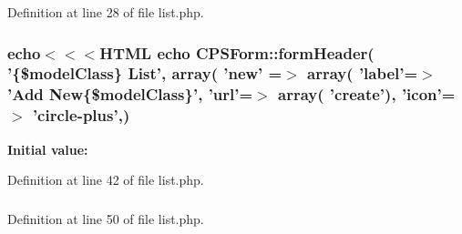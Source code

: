 Definition at line 28 of file list.php.

\hypertarget{list_8php_aa3205d038c7f8feb5c9f01ac4dfadc88}{
\subsubsection[{array}]{\setlength{\rightskip}{0pt plus 5cm}echo$<$$<$$<${\bf HTML} echo CPSForm::formHeader( '\{\$modelClass\} List', {\bf array}( 'new' =$>$ {\bf array}( 'label'=$>$ 'Add New\{\$modelClass\}', 'url'=$>$ {\bf array}( 'create'), 'icon'=$>$ 'circle-\/plus',)}}
\label{list_8php_aa3205d038c7f8feb5c9f01ac4dfadc88}
{\bfseries Initial value:}


Definition at line 42 of file list.php.

\hypertarget{list_8php_a2c8135527015cd4586959ac7c2ffec92}{
\subsubsection[{HTML}]{}}
\label{list_8php_a2c8135527015cd4586959ac7c2ffec92}


Definition at line 50 of file list.php.

